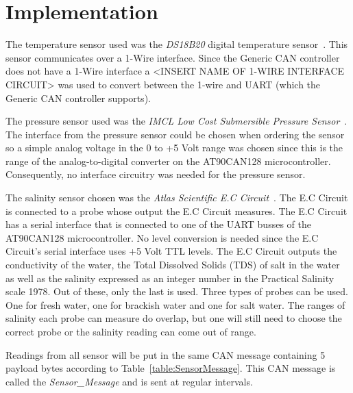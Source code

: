 
\section{Implementation}\label{sec:implementation}
The temperature sensor used was the \emph{DS18B20} digital temperature sensor~\cite{web:ds18b20}. This sensor communicates over a 1-Wire interface. Since the Generic CAN controller does not have a 1-Wire interface a <INSERT NAME OF 1-WIRE INTERFACE CIRCUIT> was used to convert between the 1-wire and UART (which the Generic CAN controller supports).

The pressure sensor used was the \emph{IMCL Low Cost Submersible Pressure Sensor}~\cite{web:imcl}. The interface from the pressure sensor could be chosen when ordering the sensor so a simple analog voltage in the 0 to +5 Volt range was chosen since this is the range of the analog-to-digital converter on the AT90CAN128 microcontroller. Consequently, no interface circuitry was needed for the pressure sensor.

The salinity sensor chosen was the \emph{Atlas Scientific E.C Circuit}~\cite{web:ec_circuit}. The E.C Circuit is connected to a probe whose output the E.C Circuit measures. The E.C Circuit has a serial interface that is connected to one of the UART busses of the AT90CAN128 microcontroller. No level conversion is needed since the E.C Circuit's serial interface uses +5 Volt TTL levels. \newline
The E.C Circuit outputs the conductivity of the water, the Total Dissolved Solids (TDS) of salt in the water as well as the salinity expressed as an integer number in the Practical Salinity scale 1978. Out of these, only the last is used. \newline
Three types of probes can be used. One for fresh water, one for brackish water and one for salt water. The ranges of salinity each probe can measure do overlap, but one will still need to choose the correct probe or the salinity reading can come out of range. 

Readings from all sensor will be put in the same CAN message containing 5 payload bytes according to Table~\ref{table:SensorMessage}. This CAN message is called the \emph{Sensor\_Message} and is sent at regular intervals.

